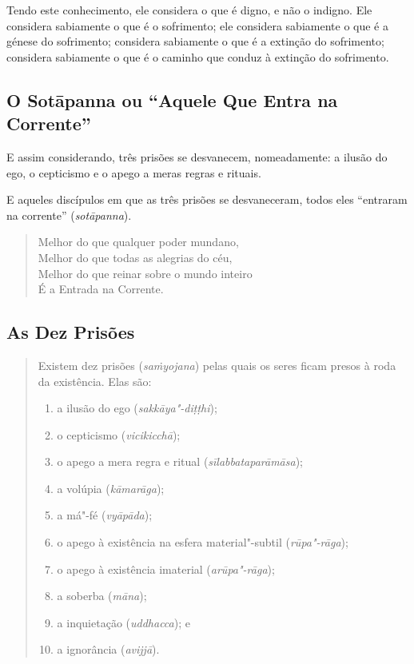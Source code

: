 Tendo este conhecimento, ele considera o que é digno, e não o indigno. Ele
considera sabiamente o que é o sofrimento; ele considera sabiamente o que é a
génese do sofrimento; considera sabiamente o que é a extinção do sofrimento;
considera sabiamente o que é o caminho que conduz à extinção do sofrimento.

\subsection{O Sotāpanna ou “Aquele Que Entra na Corrente”}

E assim considerando, três prisões se desvanecem, nomeadamente: a ilusão do ego,
o cepticismo e o apego a meras regras e rituais.


E aqueles discípulos em que as três prisões se desvaneceram, todos eles
“entraram na corrente” (\emph{sotāpanna}).


\begin{verse}
  Melhor do que qualquer poder mundano,\\
  Melhor do que todas as alegrias do céu,\\
  Melhor do que reinar sobre o mundo inteiro\\
  É a Entrada na Corrente.

\end{verse}

\subsection{As Dez Prisões}

\label{dez-prisoes}

\begin{quote}
  Existem dez prisões (\emph{sa\.{m}yojana}) pelas quais os seres ficam presos à roda da
  existência. Elas são:

  \begin{enumerate}
    \item a ilusão do ego (\emph{sakkāya"-di\d{t}\d{t}hi});
    \item o cepticismo (\emph{vicikicchā});
    \item o apego a mera regra e ritual (\emph{sīlabbataparāmāsa});
    \item a volúpia (\emph{kāmarāga});
    \item a má"-fé (\emph{vyāpāda});
    \item o apego à existência na esfera material"-subtil (\emph{rūpa"-rāga});
    \item o apego à existência imaterial (\emph{arūpa"-rāga});
    \item a soberba (\emph{māna});
    \item a inquietação (\emph{uddhacca}); e
    \item a ignorância (\emph{avijjā}).
  \end{enumerate}
\end{quote}

